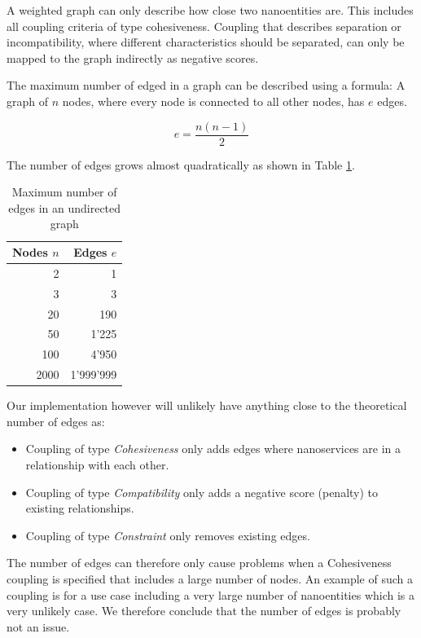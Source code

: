 A weighted graph can only describe how close two nanoentities are. This includes all coupling criteria of type cohesiveness. Coupling that describes separation or incompatibility, where different characteristics should be separated, can only be mapped to the graph indirectly as negative scores. %

The maximum number of edged in a graph can be described using a formula: A graph of $n$ nodes, where every node is connected to all other nodes, has $e$ edges.

\begin{displaymath}
e = \frac{n(n-1)}{2}
\end{displaymath}

The number of edges grows almost quadratically as shown in Table \ref{tab:edgesCount}.

\begin{table}[H]
	\centering
	\caption{Maximum number of edges in an undirected graph}
	\label{tab:edgesCount}
	\begin{tabular}{|r|r|}
	\hline \textbf{Nodes} $n$ & \textbf{Edges} $e$ \\ 
	\hline 2 & 1 \\ 
	\hline 3 & 3 \\ 
	\hline 20 & 190 \\ 
	\hline 50 & 1'225 \\ 
	\hline 100 & 4'950 \\ 
	\hline 2000 & 1'999'999 \\ 
	\hline 
	\end{tabular} 
\end{table}

Our implementation however will unlikely have anything close to the theoretical number of edges as:
\begin{itemize}
\item Coupling of type \textit{Cohesiveness} only adds edges where nanoservices are in a relationship with each other.
\item Coupling of type \textit{Compatibility} only adds a negative score (penalty) to existing relationships.
\item Coupling of type \textit{Constraint} only removes existing edges.
\end{itemize}

The number of edges can therefore only cause problems when a Cohesiveness coupling is specified that includes a large number of nodes. An example of such a coupling is for a use case including a very large number of nanoentities which is a very unlikely case. We therefore conclude that the number of edges is probably not an issue.




